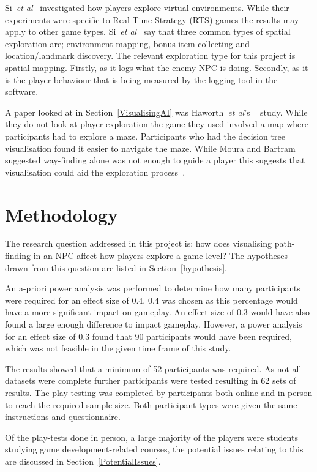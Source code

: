 \documentclass[journal]{IEEEtran}
\begin{document}
	Si~\textit{et al}~\cite{si2017} investigated how players explore virtual environments. While their experiments were specific to Real Time Strategy (RTS) games the results may apply to other game types. Si~\textit{et al}~\cite{si2017} say that three common types of spatial exploration are; environment mapping, bonus item collecting and location/landmark discovery. The relevant exploration type for this project is spatial mapping. Firstly, as it logs what the enemy NPC is doing.  Secondly, as it is the player behaviour that is being measured by the logging tool in the software.
	
	A paper looked at in Section~\ref{VisualisingAI} was Haworth~\textit{et al}'s ~\cite{Haworth2010} study. While they do not look at player exploration the game they used involved a map where participants had to explore a maze. Participants who had the decision tree visualisation found it easier to navigate the maze. While Moura and Bartram~\cite{moura2014} suggested way-finding alone was not enough to guide a player this suggests that visualisation could aid the exploration process~\cite{Haworth2010}.
	
	\section{Methodology} \label{methodology}
	The research question addressed in this project is: how does visualising path-finding in an NPC affect how players explore a game level? The hypotheses drawn from this question are listed in Section~\ref{hypothesis}.  
	
	An a-priori power analysis was performed to determine how many participants were required for an effect size of 0.4. 0.4 was chosen as this percentage would have a more significant impact on gameplay.  An effect size of 0.3 would have also found a large enough difference to impact gameplay. However, a power analysis for an effect size of 0.3 found that 90 participants would have been required, which was not feasible in the given time frame of this study.
	
	The results showed that a minimum of 52 participants was required. As not all datasets were complete further participants were tested resulting in 62 sets of results. The play-testing was completed by participants both online and in person to reach the required sample size. Both participant types were given the same instructions and questionnaire. 
	
	Of the play-tests done in person, a large majority of the players were students studying game development-related courses, the potential issues relating to this are discussed in Section~\ref{PotentialIssues}. 
	
\end{document}
